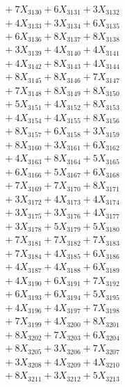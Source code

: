 \documentclass[a4paper,10pt]{article}
\begin{document}
{\begin{align}
&\;  + 7 X_{3130} + 6 X_{3131} + 3 X_{3132} \\[0.3ex]
&\;  + 4 X_{3133} + 3 X_{3134} + 6 X_{3135} \\[0.3ex]
&\;  + 6 X_{3136} + 8 X_{3137} + 8 X_{3138} \\[0.3ex]
&\;  + 3 X_{3139} + 4 X_{3140} + 4 X_{3141} \\[0.3ex]
&\;  + 4 X_{3142} + 8 X_{3143} + 4 X_{3144} \\[0.3ex]
&\;  + 8 X_{3145} + 8 X_{3146} + 7 X_{3147} \\[0.3ex]
&\;  + 7 X_{3148} + 8 X_{3149} + 8 X_{3150} \\[0.3ex]
&\;  + 5 X_{3151} + 4 X_{3152} + 8 X_{3153} \\[0.3ex]
&\;  + 4 X_{3154} + 4 X_{3155} + 8 X_{3156} \\[0.3ex]
&\;  + 8 X_{3157} + 6 X_{3158} + 3 X_{3159} \\[0.5ex]\allowbreak
&\;  + 8 X_{3160} + 3 X_{3161} + 6 X_{3162} \\[0.3ex]
&\;  + 4 X_{3163} + 8 X_{3164} + 5 X_{3165} \\[0.3ex]
&\;  + 6 X_{3166} + 5 X_{3167} + 6 X_{3168} \\[0.3ex]
&\;  + 7 X_{3169} + 7 X_{3170} + 8 X_{3171} \\[0.3ex]
&\;  + 3 X_{3172} + 4 X_{3173} + 4 X_{3174} \\[0.3ex]
&\;  + 3 X_{3175} + 3 X_{3176} + 4 X_{3177} \\[0.3ex]
&\;  + 3 X_{3178} + 5 X_{3179} + 5 X_{3180} \\[0.3ex]
&\;  + 7 X_{3181} + 7 X_{3182} + 7 X_{3183} \\[0.3ex]
&\;  + 7 X_{3184} + 4 X_{3185} + 6 X_{3186} \\[0.3ex]
&\;  + 4 X_{3187} + 4 X_{3188} + 6 X_{3189} \\[0.5ex]\allowbreak
&\;  + 4 X_{3190} + 6 X_{3191} + 7 X_{3192} \\[0.3ex]
&\;  + 6 X_{3193} + 6 X_{3194} + 5 X_{3195} \\[0.3ex]
&\;  + 4 X_{3196} + 4 X_{3197} + 7 X_{3198} \\[0.3ex]
&\;  + 7 X_{3199} + 4 X_{3200} + 8 X_{3201} \\[0.3ex]
&\;  + 8 X_{3202} + 7 X_{3203} + 6 X_{3204} \\[0.3ex]
&\;  + 8 X_{3205} + 3 X_{3206} + 7 X_{3207} \\[0.3ex]
&\;  + 3 X_{3208} + 4 X_{3209} + 4 X_{3210} \\[0.3ex]
&\;  + 8 X_{3211} + 3 X_{3212} + 5 X_{3213} \\[0.3ex]

\end{align}}
\end{document}
